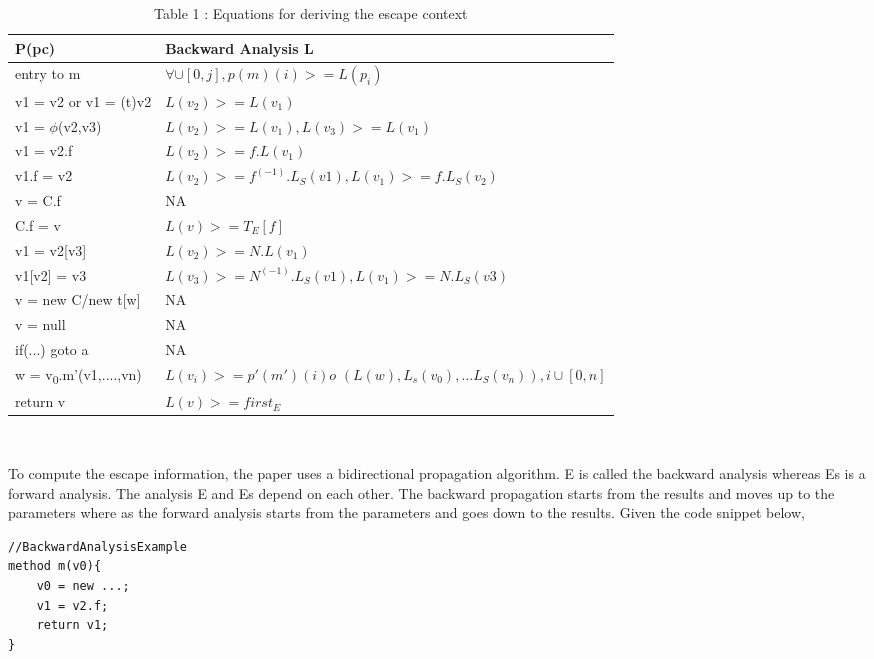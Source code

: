 \documentclass[peerreview]{IEEEtran}
\begin{document}
\begin{table}
\centering
\begin{tabular}{| p{3cm} | p{5cm} |}
\hline
P(pc) & Backward Analysis L \\
\hline
entry to m & $\forall \cup [0,j], p(m)(i) >= L(p_i)$ \\ 
v1 = v2 or v1 = (t)v2 & $L(v_2) >= L(v_1)$ \\
v1 = $\phi$(v2,v3) & $L(v_2) >= L(v_1), L(v_3) >= L(v_1)$ \\
v1 = v2.f & $L(v_2) >= f.L(v_1)$ \\
v1.f = v2 & $L(v_2) >= f^(-1).L_S(v1),L(v_1) >= f.L_S(v_2)$ \\
v = C.f & NA \\
C.f = v & $L(v) >= T_E[f]$ \\
v1 = v2[v3] & $L(v_2) >= N.L(v_1)$ \\
v1[v2] = v3 & $L(v_3) >= N^(-1).L_S(v1),L(v_1) >= N.L_S(v3)$ \\
v = new C/new t[w] & NA \\
v = null & NA \\
if(...) goto a & NA \\
w = v\textsubscript{0}.m'(v1,....,vn) & $L(v_i) >= p'(m')(i) o $ \newline $ (L(w),L_s(v_0),...L_S(v_n)),i \cup [0,n]$ \\
return v & $L(v) >= first_E$ \\
\hline
\end{tabular}
\\[10pt]
\caption*{Table 1 : Equations for deriving the escape context}
\end{table}
To compute the escape information, the paper uses a bidirectional propagation algorithm. E is called the backward analysis whereas Es is a forward analysis. The analysis E and Es depend on each other. The backward propagation starts from the results and moves up to the parameters where as the forward analysis starts from the parameters and goes down to the results. Given the code snippet below,
\begin{lstlisting}
//BackwardAnalysisExample
method m(v0){
	v0 = new ...;
	v1 = v2.f;
	return v1;	
}
\end{lstlisting}
\end{document}
